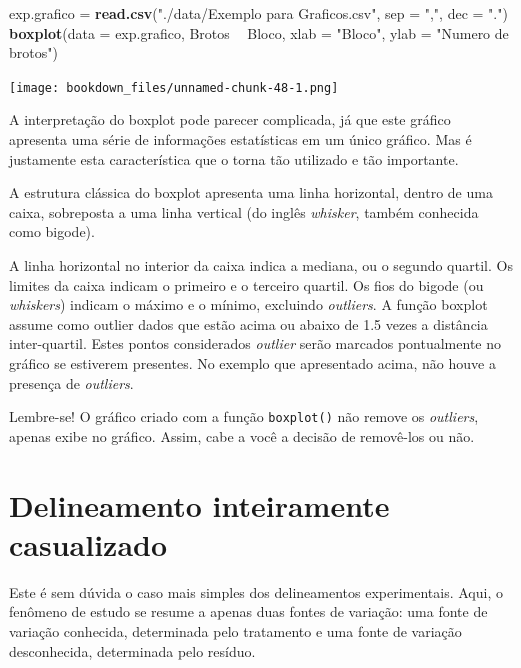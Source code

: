 \documentclass[
]{article}
\newenvironment{Shaded}{\begin{snugshade}}{\end{snugshade}}
\newcommand{\DataTypeTok}[1]{\textcolor[rgb]{0.13,0.29,0.53}{#1}}
\newcommand{\KeywordTok}[1]{\textcolor[rgb]{0.13,0.29,0.53}{\textbf{#1}}}
\newcommand{\NormalTok}[1]{#1}
\newcommand{\OperatorTok}[1]{\textcolor[rgb]{0.81,0.36,0.00}{\textbf{#1}}}
\newcommand{\StringTok}[1]{\textcolor[rgb]{0.31,0.60,0.02}{#1}}
\begin{document}
\begin{Shaded}
\begin{Highlighting}[]
\NormalTok{exp.grafico =}\StringTok{ }\KeywordTok{read.csv}\NormalTok{(}\StringTok{"./data/Exemplo para Graficos.csv"}\NormalTok{, }\DataTypeTok{sep =} \StringTok{","}\NormalTok{, }\DataTypeTok{dec =} \StringTok{"."}\NormalTok{)}
\KeywordTok{boxplot}\NormalTok{(}\DataTypeTok{data =}\NormalTok{ exp.grafico, Brotos }\OperatorTok{~}\StringTok{ }\NormalTok{Bloco, }
        \DataTypeTok{xlab =} \StringTok{"Bloco"}\NormalTok{, }
        \DataTypeTok{ylab =} \StringTok{"Numero de brotos"}\NormalTok{)}
\end{Highlighting}
\end{Shaded}

\texttt{[image: bookdown\_files/unnamed-chunk-48-1.png]}

A interpretação do boxplot pode parecer complicada, já que este gráfico apresenta uma série de informações estatísticas em um único gráfico. Mas é justamente esta característica que o torna tão utilizado e tão importante.

A estrutura clássica do boxplot apresenta uma linha horizontal, dentro de uma caixa, sobreposta a uma linha vertical (do inglês \emph{whisker}, também conhecida como bigode).

A linha horizontal no interior da caixa indica a mediana, ou o segundo quartil. Os limites da caixa indicam o primeiro e o terceiro quartil. Os fios do bigode (ou \emph{whiskers}) indicam o máximo e o mínimo, excluindo \emph{outliers}. A função boxplot assume como outlier dados que estão acima ou abaixo de 1.5 vezes a distância inter-quartil. Estes pontos considerados \emph{outlier} serão marcados pontualmente no gráfico se estiverem presentes. No exemplo que apresentado acima, não houve a presença de \emph{outliers}.

Lembre-se! O gráfico criado com a função \texttt{boxplot()} não remove os \emph{outliers}, apenas exibe no gráfico. Assim, cabe a você a decisão de removê-los ou não.

\hypertarget{delineamento-inteiramente-casualizado}{%
\section{Delineamento inteiramente casualizado}\label{delineamento-inteiramente-casualizado}}

Este é sem dúvida o caso mais simples dos delineamentos experimentais. Aqui, o fenômeno de estudo se resume a apenas duas fontes de variação: uma fonte de variação conhecida, determinada pelo tratamento e uma fonte de variação desconhecida, determinada pelo resíduo.
\end{document}

